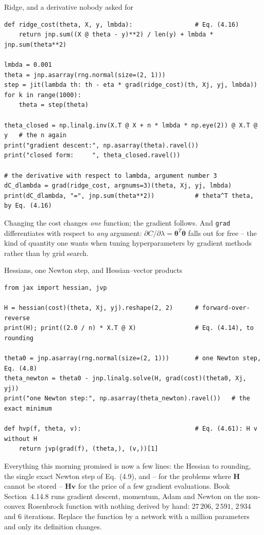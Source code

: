 \documentclass[10pt,aspectratio=169]{beamer}
\begin{document}
\begin{frame}[fragile]{Ridge, and a derivative nobody asked for}
\begin{lstlisting}
def ridge_cost(theta, X, y, lmbda):                 # Eq. (4.16)
    return jnp.sum((X @ theta - y)**2) / len(y) + lmbda * jnp.sum(theta**2)

lmbda = 0.001
theta = jnp.asarray(rng.normal(size=(2, 1)))
step = jit(lambda th: th - eta * grad(ridge_cost)(th, Xj, yj, lmbda))
for k in range(1000):
    theta = step(theta)

theta_closed = np.linalg.inv(X.T @ X + n * lmbda * np.eye(2)) @ X.T @ y   # the n again
print("gradient descent:", np.asarray(theta).ravel())
print("closed form:     ", theta_closed.ravel())

# the derivative with respect to lambda, argument number 3
dC_dlambda = grad(ridge_cost, argnums=3)(theta, Xj, yj, lmbda)
print(dC_dlambda, "=", jnp.sum(theta**2))           # theta^T theta, by Eq. (4.16)
\end{lstlisting}
\small
Changing the cost changes \emph{one} function; the gradient follows.
And \texttt{grad} differentiates with respect to \emph{any} argument:
$\partial C/\partial\lambda=\bm{\theta}^T\bm{\theta}$ falls out for free --
the kind of quantity one wants when tuning hyperparameters by gradient
methods rather than by grid search.
\end{frame}

\begin{frame}[fragile]{Hessians, one Newton step, and Hessian--vector products}
\begin{lstlisting}
from jax import hessian, jvp

H = hessian(cost)(theta, Xj, yj).reshape(2, 2)      # forward-over-reverse
print(H); print((2.0 / n) * X.T @ X)                # Eq. (4.14), to rounding

theta0 = jnp.asarray(rng.normal(size=(2, 1)))       # one Newton step, Eq. (4.8)
theta_newton = theta0 - jnp.linalg.solve(H, grad(cost)(theta0, Xj, yj))
print("one Newton step:", np.asarray(theta_newton).ravel())   # the exact minimum

def hvp(f, theta, v):                               # Eq. (4.61): H v without H
    return jvp(grad(f), (theta,), (v,))[1]
\end{lstlisting}
\small
Everything this morning promised is now a few lines: the Hessian to rounding,
the single exact Newton step of Eq.~(4.9), and -- for the problems where
$\bm{H}$ cannot be stored -- $\bm{H}\bm{v}$ for the price of a few gradient
evaluations.  Book Section~4.14.8 runs gradient descent, momentum, Adam and
Newton on the non-convex Rosenbrock function with nothing derived by hand:
$27\,206$, $2\,591$, $2\,934$ and $6$ iterations.  Replace the function by a
network with a million parameters and only its definition changes.
\end{frame}
\end{document}

